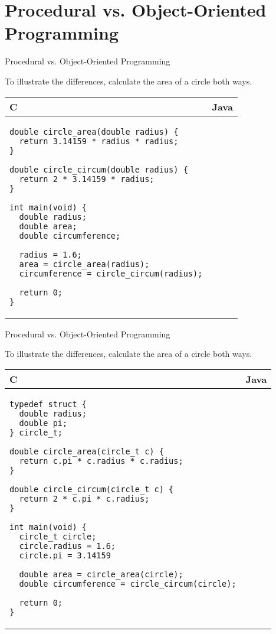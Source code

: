 \documentclass{beamer}
\begin{document}
\section{Procedural vs. Object-Oriented Programming}

\begin{frame}[fragile]{Procedural vs. Object-Oriented Programming}

To illustrate the differences, calculate the area of a circle both ways.

\centering
\begin{tabular}{@{}m{} | m{}@{}}
C					&					Java	\\
\hline
\begin{Verbatim}[fontsize=\tiny]
double circle_area(double radius) {
  return 3.14159 * radius * radius;
}

double circle_circum(double radius) {
  return 2 * 3.14159 * radius;
}

int main(void) {
  double radius;
  double area;
  double circumference;

  radius = 1.6;
  area = circle_area(radius);
  circumference = circle_circum(radius);
	
  return 0;
}
\end{Verbatim}	

\end{tabular}

\end{frame}

\begin{frame}[fragile]{Procedural vs. Object-Oriented Programming}

To illustrate the differences, calculate the area of a circle both ways.

\centering
\begin{tabular}{@{}m{} | m{}@{}}
C					&					Java	\\
\hline
\begin{Verbatim}[fontsize=\tiny]
typedef struct {
  double radius;
  double pi;
} circle_t;

double circle_area(circle_t c) {
  return c.pi * c.radius * c.radius;
}

double circle_circum(circle_t c) {
  return 2 * c.pi * c.radius;
}

int main(void) {
  circle_t circle;
  circle.radius = 1.6;
  circle.pi = 3.14159
  
  double area = circle_area(circle);
  double circumference = circle_circum(circle);
	
  return 0;
}
\end{Verbatim}	

\end{tabular}

\end{frame}
\end{document}
